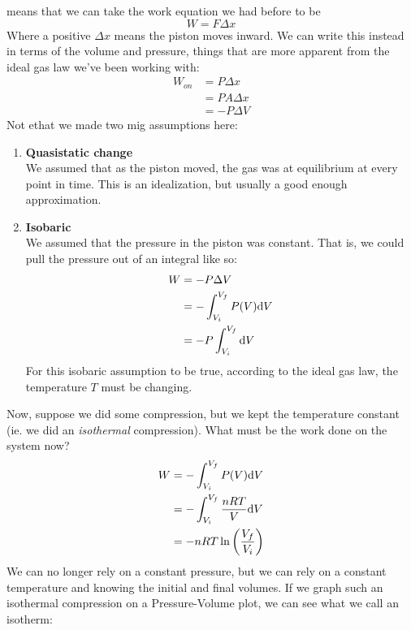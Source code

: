 \documentclass[a4paper]{article}
\begin{document}
means that we can take the work equation we had before to be
\[ W = F\Delta x \]
Where a positive $\Delta x$ means the piston moves inward. We can write this
instead in terms of the volume and pressure, things that are more apparent
from the ideal gas law we've been working with:
\begin{align*}
	W_{on} &= P\Delta x\\
	       &= PA\Delta x\\
	       &= -P\Delta V
\end{align*}
Not ethat we made two mig assumptions here:
\begin{enumerate}
	\item \textbf{Quasistatic change}\\
		We assumed that as the piston moved, the gas was at equilibrium
		at every point in time. This is an idealization, but usually
		a good enough approximation.
	\item \textbf{Isobaric}\\
		We assumed that the pressure in the piston was constant.
		That is, we could pull the pressure out of an integral like
		so:
		\begin{align*}
			W &= -P\Delta V\\
			  &= -\int_{V_i}^{V_f} P(V)\mathrm{d} V\\
			  &= -P\int_{V_i}^{V_f} \mathrm{d} V
		\end{align*}
		For this isobaric assumption to be true, according to the ideal
		gas law, the temperature $T$ must be changing.
\end{enumerate}

Now, suppose we did some compression, but we kept the temperature constant
(ie. we did an \emph{isothermal} compression).
What must be the work done on the system now?
\begin{align*}
	W &= -\int_{V_i}^{V_f} P(V)\mathrm{d} V\\
	  &= -\int_{V_i}^{V_f}\frac{nRT}{V}\mathrm{d} V\\
	  &= -nRT\ln\left(\frac{V_f}{V_i}\right)
\end{align*}
We can no longer rely on a constant pressure, but we can rely on a constant
temperature and knowing the initial and final volumes. If we graph such an
isothermal compression on a Pressure-Volume plot, we can see what we
call an isotherm:
\end{document}
